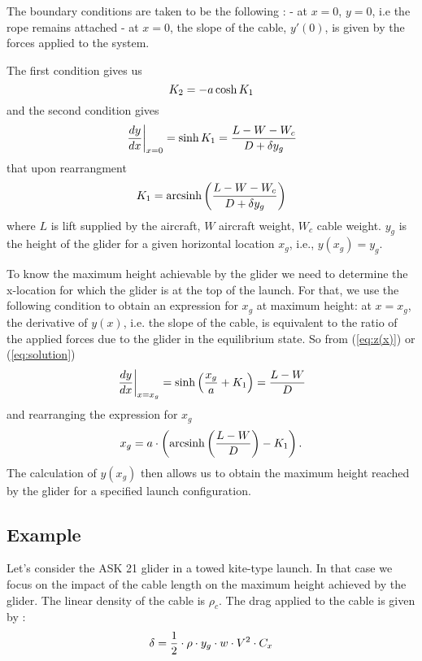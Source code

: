 \documentclass[11pt]{amsart}
\DeclareMathOperator{\arcsinh}{arcsinh}
\begin{document}
The boundary conditions are taken to be the following :\newline
- at $x=0$, $y=0$, i.e the rope remains attached \newline
- at $x=0$, the slope of the cable, $y\prime(0)$, is given by the forces applied to the system.

The first condition gives us
\begin{equation}
	\centering
	K_2 =-a \cosh{K_1}
	\label{eq:K2}
\end{equation}
and the second condition gives
\begin{equation}
	\centering
	\left. \frac{dy}{dx}\right|_{x=0} = \sinh{K_1} = \frac{L-W-W_c}{D + \delta y_g}
	\label{eq:bc1}
\end{equation}
that upon rearrangment
\begin{equation}
	\centering
	K_1 = \arcsinh \left(\frac{L-W-W_c}{D + \delta y_g}\right)
	\label{eq:K1}
\end{equation}
where $L$ is lift supplied by the aircraft, $W$ aircraft weight, $W_c$ cable weight. $y_g$ is the height of the glider for a given horizontal location $x_g$, i.e., $y(x_g)=y_g$. 

To know the maximum height achievable by the glider we need to determine the x-location for which the glider is at the top of the launch. For that, we use the following condition to obtain an expression for $x_g$ at maximum height: at $x=x_g$, the derivative of $y(x)$, i.e. the slope of the cable, is equivalent to the ratio of the applied forces due to the glider in the equilibrium state. So from (\ref{eq:z(x)}) or (\ref{eq:solution})
\begin{equation}
	\centering
	\left. \frac{dy}{dx}\right|_{x=x_g}=\sinh\left(\frac{x_g}{a} + K_1 \right) = \frac{L-W}{D}
	\label{eq:bc2}
\end{equation}
and rearranging the expression for $x_g$ 
\begin{equation}
	\centering
	 x_g=a \cdot \left( \arcsinh \left(\frac{L-W}{D}\right) - K_1 \right).
	\label{eq:x_g}
\end{equation}
The calculation of $y(x_g)$ then allows us to obtain the maximum height reached by the glider for a specified launch configuration.


\subsection{Example}

Let's consider the ASK 21 glider in a towed kite-type launch. In that case we focus on the impact of the cable length on the maximum height achieved by the glider. The linear density of the cable is $\rho_c$. The drag applied to the cable is given by : 
\begin{equation}
	\centering
	\delta=\frac{1}{2}\cdot \rho \cdot y_g \cdot w \cdot V^2 \cdot C_x
	\label{eq:delta}
\end{equation}
\end{document}
